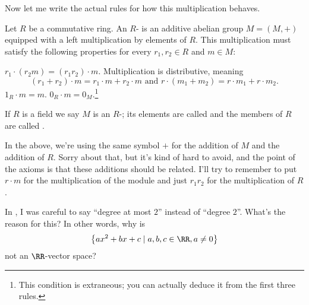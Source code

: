 Now let me write the actual rules for how this multiplication behaves.
\begin{definition}
	Let $R$ be a commutative ring.
	An $R$- is an additive abelian group $M = (M,+)$
	equipped with a left multiplication by elements of $R$.
	This multiplication must satisfy the following properties
	for every $r_1, r_2 \in R$ and $m \in M$:
	\begin{enumerate}[(i)]
		\ii $r_1 \cdot (r_2 m) = (r_1r_2) \cdot m$.
		\ii Multiplication is distributive, meaning
		\[ (r_1+r_2) \cdot m = r_1 \cdot m + r_2 \cdot m 
			\text{ and }
			r \cdot (m_1 + m_2) = r \cdot m_1 + r \cdot m_2. \]
		\ii $1_R \cdot m = m$.
		\ii $0_R \cdot m = 0_M$.\footnote{This condition is 
			extraneous; you can actually deduce it
			from the first three rules.}
	\end{enumerate}
	If $R$ is a field we say $M$ is an $R$-;
	its elements are called 
	and the members of $R$ are called .
\end{definition}

\begin{abuse}
	In the above, we're using the same symbol $+$ for the addition of $M$
	and the addition of $R$.
	Sorry about that, but it's kind of hard to avoid, and the point
	of the axioms is that these additions should be related.
	I'll try to remember to put $r \cdot m$ for the multiplication of the module
	and just $r_1r_2$ for the multiplication of $R$.
\end{abuse}

\begin{ques}
	In ,
	I was careful to say ``degree at most $2$'' instead of ``degree $2$''.
	What's the reason for this?
	In other words, why is
	\[ \left\{ ax^2 + bx + c \mid a,b,c \in \RR, a \neq 0  \right\} \]
	not an $\RR$-vector space?
\end{ques}

